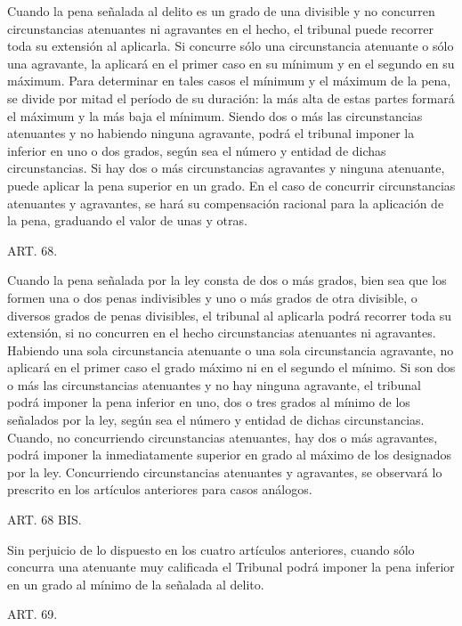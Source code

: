     Cuando la pena señalada al delito es un grado de una divisible y no concurren circunstancias atenuantes ni agravantes en el hecho, el tribunal puede recorrer toda su extensión al aplicarla.
    Si concurre sólo una circunstancia atenuante o sólo una agravante, la aplicará en el primer caso en su mínimum y en el segundo en su máximum.
    Para determinar en tales casos el mínimum y el máximum de la pena, se divide por mitad el período de su duración: la más alta de estas partes formará el máximum y la más baja el mínimum.
    Siendo dos o más las circunstancias atenuantes y no habiendo ninguna agravante, podrá el tribunal imponer la inferior en uno o dos grados, según sea el número y entidad de dichas circunstancias.
    Si hay dos o más circunstancias agravantes y ninguna atenuante, puede aplicar la pena superior en un grado.
    En el caso de concurrir circunstancias atenuantes y agravantes, se hará su compensación racional para la aplicación de la pena, graduando el valor de unas y otras.




    ART. 68.

    Cuando la pena señalada por la ley consta de dos o más grados, bien sea que los formen una o dos penas indivisibles y uno o más grados de otra divisible, o diversos grados de penas divisibles, el tribunal al aplicarla podrá recorrer toda su extensión, si no concurren en el hecho circunstancias atenuantes ni agravantes.
    Habiendo una sola circunstancia atenuante o una sola circunstancia agravante, no aplicará en el primer caso el grado máximo ni en el segundo el mínimo.
    Si son dos o más las circunstancias atenuantes y no hay ninguna agravante, el tribunal podrá imponer la pena inferior en uno, dos o tres grados al mínimo de los señalados por la ley, según sea el número y entidad de dichas circunstancias.
    Cuando, no concurriendo circunstancias atenuantes, hay dos o más agravantes, podrá imponer la inmediatamente superior en grado al máximo de los designados por la ley.
    Concurriendo circunstancias atenuantes y agravantes, se observará lo prescrito en los artículos anteriores para casos análogos.



    ART. 68 BIS.

    Sin perjuicio de lo dispuesto en los cuatro artículos anteriores, cuando sólo concurra una atenuante muy calificada el Tribunal podrá imponer la pena inferior en un grado al mínimo de la señalada al delito.

    ART. 69.

